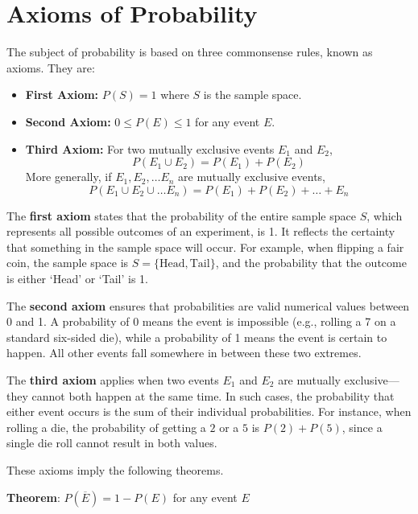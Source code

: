 \documentclass[twoside]{book}
\begin{document}
\section{Axioms of Probability}
The subject of probability is based on three commonsense rules, known as axioms. They are:

\begin{textbox}
    \begin{itemize}
        \item \textbf{First Axiom:} $P(S) = 1$ where $S$ is the sample space.
        \item \textbf{Second Axiom:} $0 \leq P(E) \leq 1$ for any event $E$.
        \item \textbf{Third Axiom:} For two mutually exclusive events $E_1$ and $E_2$, $$P(E_1 \cup E_2) = P(E_1) + P(E_2)$$
        More generally, if $E_1, E_2, \dots E_n$ are mutually exclusive events,
        $$P(E_1 \cup E_2 \cup \dots E_n) = P(E_1) + P(E_2) + \dots + E_n$$
    \end{itemize}
\end{textbox}


The \textbf{first axiom} states that the probability of the entire sample space $S$, which represents all possible outcomes of an experiment, is 1. It reflects the certainty that something in the sample space will occur. For example, when flipping a fair coin, the sample space is $S = \{\text{Head}, \text{Tail}\}$, and the probability that the outcome is either `Head' or `Tail' is 1.

The \textbf{second axiom} ensures that probabilities are valid numerical values between 0 and 1. A probability of 0 means the event is impossible (e.g., rolling a 7 on a standard six-sided die), while a probability of 1 means the event is certain to happen. All other events fall somewhere in between these two extremes.

The \textbf{third axiom} applies when two events $E_1$ and $E_2$ are mutually exclusive—they cannot both happen at the same time. In such cases, the probability that either event occurs is the sum of their individual probabilities. For instance, when rolling a die, the probability of getting a $2$ or a $5$ is $P(2)+P(5)$, since a single die roll cannot result in both values.

These axioms imply the following theorems.
\begin{textbox}
\textbf{Theorem}: $P(\overline{E}) = 1 - P(E)$ for any event $E$
\end{textbox}
\end{document}
